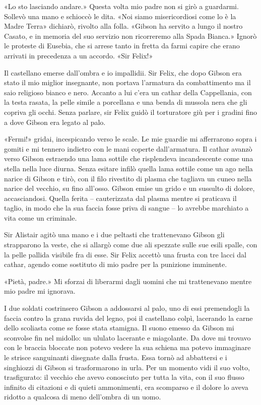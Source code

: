 «Lo sto lasciando andare.» Questa volta mio padre non si girò a
guardarmi. Sollevò una mano e schioccò le dita. «Noi siamo
misericordiosi come lo è la Madre Terra» dichiarò, rivolto alla folla.
«Gibson ha servito a lungo il nostro Casato, e in memoria del suo
servizio non ricorreremo alla Spada Bianca.» Ignorò le proteste di
Eusebia, che si arrese tanto in fretta da farmi capire che erano
arrivati in precedenza a un accordo. «Sir Felix!»

Il castellano emerse dall'ombra e io impallidii. Sir Felix, che dopo
Gibson era stato il mio miglior insegnante, non portava l'armatura da
combattimento ma il saio religioso bianco e nero. Accanto a lui c'era un
cathar della Cappellania, con la testa rasata, la pelle simile a
porcellana e una benda di mussola nera che gli copriva gli occhi. Senza
parlare, sir Felix guidò il torturatore giù per i gradini fino a dove
Gibson era legato al palo.

«Fermi!» gridai, incespicando verso le scale. Le mie guardie mi
afferrarono sopra i gomiti e mi tennero indietro con le mani coperte
dall'armatura. Il cathar avanzò verso Gibson estraendo una lama sottile
che risplendeva incandescente come una stella nella luce diurna. Senza
esitare infilò quella lama sottile come un ago nella narice di Gibson e
tirò, con il filo rivestito di plasma che tagliava un cuneo nella narice
del vecchio, su fino all'osso. Gibson emise un grido e un sussulto di
dolore, accasciandosi. Quella ferita -- cauterizzata dal plasma mentre
si praticava il taglio, in modo che la sua faccia fosse priva di sangue
-- lo avrebbe marchiato a vita come un criminale.

Sir Alistair agitò una mano e i due peltasti che trattenevano Gibson gli
strapparono la veste, che si allargò come due ali spezzate sulle sue
esili spalle, con la pelle pallida visibile fra di esse. Sir Felix
accettò una frusta con tre lacci dal cathar, agendo come sostituto di
mio padre per la punizione imminente.

«Pietà, padre.» Mi sforzai di liberarmi dagli uomini che mi trattenevano
mentre mio padre mi ignorava.

I due soldati costrinsero Gibson a addossarsi al palo, uno di essi
premendogli la faccia contro la grana ruvida del legno, poi il
castellano colpì, lacerando la carne dello scoliasta come se fosse stata
stamigna. Il suono emesso da Gibson mi sconvolse fin nel midollo: un
ululato lacerante e miagolante. Da dove mi trovavo con le braccia
bloccate non potevo vedere la sua schiena ma potevo immaginare le
strisce sanguinanti disegnate dalla frusta. Essa tornò ad abbattersi e i
singhiozzi di Gibson si trasformarono in urla. Per un momento vidi il
suo volto, trasfigurato: il vecchio che avevo conosciuto per tutta la
vita, con il suo flusso infinito di citazioni e di quieti ammonimenti,
era scomparso e il dolore lo aveva ridotto a qualcosa di meno dell'ombra
di un uomo.

